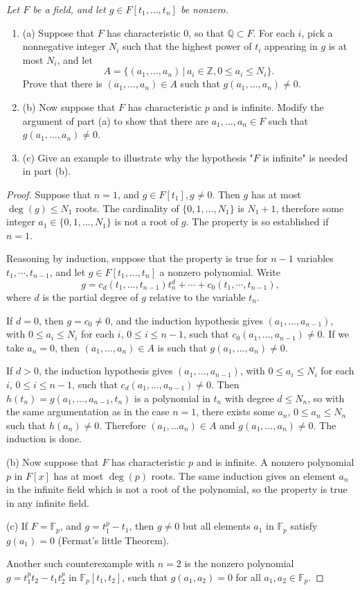 \documentclass[11pt,a4paper]{article}
\newcommand{\be} {\begin{enumerate}}
\newcommand{\ee} {\end{enumerate}}
\newcommand{\Q}{\mathbb{Q}}
\newcommand{\Z}{\mathbb{Z}}
\newcommand{\F}{\mathbb{F}}
\begin{document}
{\it Let $F$ be a field, and let $g \in F[t_1,\ldots,t_n]$ be nonzero.
\be
\item[(a)] Suppose that $F$ has characteristic 0, so that $\Q \subset F$. For each $i$, pick a nonnegative integer $N_i$ such that the highest power of $t_i$ appearing in $g$ is at most $N_i$, and let
$$A = \{(a_1,\ldots,a_n) \, |\, a_i \in \Z, 0 \leq a_i\leq N_i\}.$$
Prove that there is $(a_1,\ldots,a_n) \in A$ such that $g(a_1,\ldots,a_n) \ne 0$.

\item[(b)] Now suppose that $F$ has characteristic $p$ and is infinite. Modify the argument of part (a) to show that there are $a_1,\ldots,a_n \in F$ such that $g(a_1,\ldots,a_n) \ne 0$.

\item[(c)] Give an example to illustrate why the hypothesis "$F$ is infinite" is needed in part (b).
\ee
}

\begin{proof}
Suppose that $n = 1$, and $g \in F[t_1], g\ne 0$. Then $g$ has at most $\deg(g) \leq N_1$ roots. The cardinality of $\{0,1,\ldots,N_1\}$ is $N_1+1$, therefore some integer $a_1 \in \{0,1,\ldots,N_1\}$ is not a root of $g$. The property is so established if $n=1$.

Reasoning by induction, suppose that the property is true for $n-1$ variables $t_1,\cdots, t_{n-1}$, and let $g \in F[t_1,\ldots,t_n]$ a nonzero polynomial. Write
$$g = c_d(t_1,\ldots,t_{n-1}) t_n^d + \cdots+c_0(t_1,\cdots,t_{n-1}),$$
where $d$ is the partial degree of $g$ relative to the variable $t_{n}$.

If $d = 0$, then $g = c_0 \ne 0$, and the induction hypothesis gives $(a_1,\ldots,a_{n-1})$, with $0\leq a_i \leq N_i$ for each $i$, $0\leq i \leq n-1$, such that $c_0(a_1,\ldots,a_{n-1}) \ne 0$. If we take $a_n = 0$, then $(a_1,\ldots,a_n) \in A$ is such that $g(a_1,\ldots,a_n) \ne 0$.

If $d>0$, the induction hypothesis gives $(a_1,\ldots,a_{n-1})$, with $0\leq a_i \leq N_i$ for each $i$, $0\leq i \leq n-1$, such that $c_d(a_1,\ldots,a_{n-1}) \ne 0$. Then $h(t_n) = g(a_1,\ldots,a_{n-1}, t_n)$ is a polynomial in $t_n$ with degree $d \leq N_n$, so with the same argumentation as in the case $n=1$, there exists some $a_{n}$, $0 \leq a_n  \leq N_n$ such that $h(a_n) \ne 0$. Therefore $(a_1,\ldots a_n) \in A$ and $g(a_1,\ldots,a_n) \ne 0$. The induction is done.

\item[(b)] Now suppose that $F$ has characteristic $p$ and is infinite. A nonzero polynomial $p$ in $F[x]$ has at most $\deg(p)$ roots. The same induction gives an element $a_n$ in the infinite field which is not a root of the polynomial, so the property is true in any infinite field.

\item[(c)] If $F = \F_p$, and  $g = t_1^p - t_1$, then $g \ne 0$ but all elements $a_1$ in $\F_p$ satisfy $g(a_1) = 0$ (Fermat's little Theorem).

Another such counterexample  with $n=2$ is the nonzero polynomial  $g = t_1^p t_2 - t_1 t_2^p$ in $\F_p[t_1,t_2]$, such that $g(a_1,a_2) = 0$ for all $a_1,a_2 \in \F_p$.
\end{proof}
\end{document}
